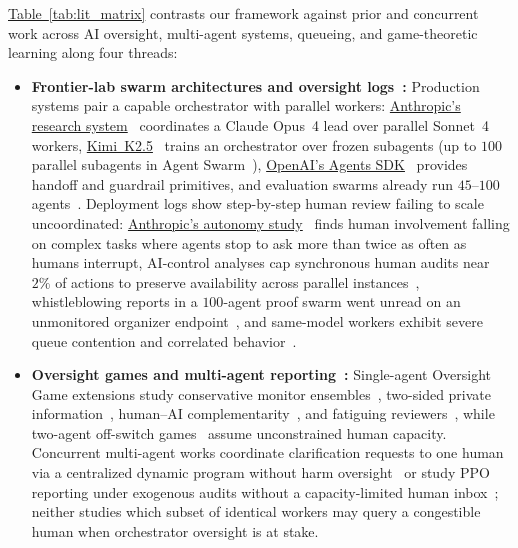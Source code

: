 \documentclass[11pt,reqno]{amsart}
\theoremstyle{spacious}
\newcommand{\Wtxt}[1]{\textcolor{colW}{#1}}
\newcommand{\Ftxt}[1]{\textcolor{colF}{#1}}
\newcommand{\Htxt}[1]{\textcolor{colH}{#1}}
\begin{document}
\hyperref[tab:lit_matrix]{Table~\ref{tab:lit_matrix}} contrasts our framework against prior and concurrent work across AI oversight, multi-agent systems, queueing, and game-theoretic learning along four threads:
\begin{itemize}
  \setlength{\itemsep}{4pt}
  \item \textbf{Frontier-lab swarm architectures and oversight logs~\cite{anthropic2025research,openai2025agents,kimi2026k25,moonshot2026k25blog,anthropic2026autonomy,paglieri2026swarm,anthropic2026multiagent,greenblatt2024control,lindner2025control,reid2026risks}:}
  Production systems pair a capable \Ftxt{orchestrator} with parallel \Wtxt{workers}: \href{https://www.anthropic.com/research/multi-agent-research-system}{Anthropic's research system}~\cite{anthropic2025research} coordinates a Claude Opus~4 lead over parallel Sonnet~4 \Wtxt{workers}, \href{https://arxiv.org/abs/2602.02276}{Kimi~K2.5}~\cite{kimi2026k25} trains an \Ftxt{orchestrator} over frozen subagents (up to $100$ parallel subagents in Agent Swarm~\cite{moonshot2026k25blog}), \href{https://openai.com/index/new-tools-for-building-agents/}{OpenAI's Agents SDK}~\cite{openai2025agents} provides handoff and guardrail primitives, and evaluation swarms already run $45$--$100$ agents~\cite{anthropic2026multiagent,paglieri2026swarm}. Deployment logs show step-by-step \Htxt{human} review failing to scale uncoordinated: \href{https://www.anthropic.com/research/measuring-agent-autonomy}{Anthropic's autonomy study}~\cite{anthropic2026autonomy} finds \Htxt{human} involvement falling on complex tasks where agents stop to ask more than twice as often as \Htxt{humans} interrupt, AI-control analyses cap synchronous \Htxt{human} audits near $2\%$ of actions to preserve availability across parallel instances~\cite{greenblatt2024control,lindner2025control,reid2026risks}, whistleblowing reports in a $100$-agent proof swarm went unread on an unmonitored organizer endpoint~\cite{paglieri2026swarm}, and same-model \Wtxt{workers} exhibit severe queue contention and correlated behavior~\cite{anthropic2026multiagent}.

  \item \textbf{Oversight games and multi-agent reporting~\cite{overman2026oversight,overman2026conservatism,tong2026contextual,turan2026capacity,mclaughlin2024complementarity,agrawal2026offswitch,wang2026ask,casheekar2026report}:}
  Single-agent Oversight Game extensions study conservative monitor ensembles~\cite{overman2026conservatism}, two-sided private information~\cite{tong2026contextual}, \Htxt{human}--AI complementarity~\cite{mclaughlin2024complementarity}, and fatiguing \Htxt{reviewers}~\cite{turan2026capacity}, while two-agent off-switch games~\cite{agrawal2026offswitch} assume unconstrained \Htxt{human} capacity. Concurrent multi-agent works coordinate clarification requests to one \Htxt{human} via a centralized dynamic program without harm oversight~\cite{wang2026ask} or study PPO reporting under exogenous audits without a capacity-limited \Htxt{human} inbox~\cite{casheekar2026report}; neither studies which subset of identical \Wtxt{workers} may query a congestible \Htxt{human} when \Ftxt{orchestrator} oversight is at stake.


\end{itemize}
\end{document}

